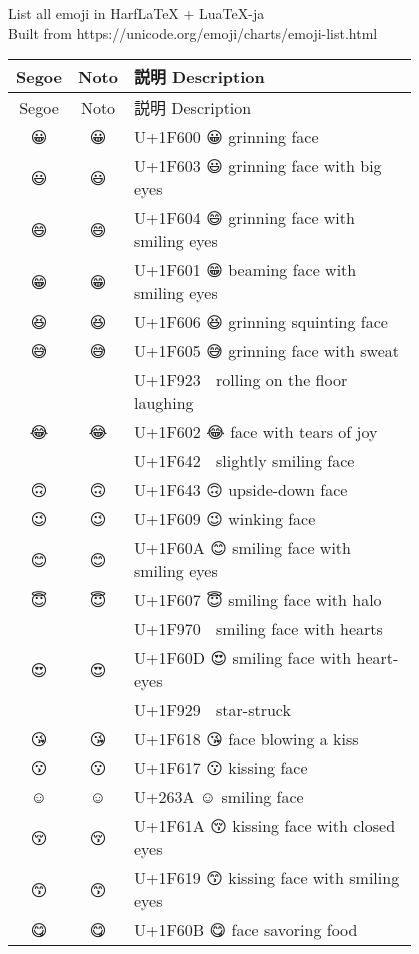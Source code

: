\documentclass[a4paper,12pt]{ltjarticle}
\newcommand{\fontA}[1]{{\fontspec[RawFeature={mode=harf,dist,ccmp}]{Segoe UI Emoji} #1}}
\newcommand{\fontB}[1]{{\fontspec[RawFeature={mode=harf,dist,ccmp}]{Noto Color Emoji} #1}}
\begin{document}
\noindent
List all emoji in HarfLaTeX + LuaTeX-ja\\
Built from https://unicode.org/emoji/charts/emoji-list.html

\noindent
\begin{longtable}[c]{ccp{0.8\linewidth}}
Segoe&Noto&説明 Description\\\hline
\endfirsthead  
Segoe&Noto&説明 Description\\\hline
\endhead  
\fontA{😀}&\fontB{😀}&U+1F600 😀 grinning face\\
\fontA{😃}&\fontB{😃}&U+1F603 😃 grinning face with big eyes\\
\fontA{😄}&\fontB{😄}&U+1F604 😄 grinning face with smiling eyes\\
\fontA{😁}&\fontB{😁}&U+1F601 😁 beaming face with smiling eyes\\
\fontA{😆}&\fontB{😆}&U+1F606 😆 grinning squinting face\\
\fontA{😅}&\fontB{😅}&U+1F605 😅 grinning face with sweat\\
\fontA{🤣}&\fontB{🤣}&U+1F923 🤣 rolling on the floor laughing\\
\fontA{😂}&\fontB{😂}&U+1F602 😂 face with tears of joy\\
\fontA{🙂}&\fontB{🙂}&U+1F642 🙂 slightly smiling face\\
\fontA{🙃}&\fontB{🙃}&U+1F643 🙃 upside-down face\\
\fontA{😉}&\fontB{😉}&U+1F609 😉 winking face\\
\fontA{😊}&\fontB{😊}&U+1F60A 😊 smiling face with smiling eyes\\
\fontA{😇}&\fontB{😇}&U+1F607 😇 smiling face with halo\\
\fontA{🥰}&\fontB{🥰}&U+1F970 🥰 smiling face with hearts\\
\fontA{😍}&\fontB{😍}&U+1F60D 😍 smiling face with heart-eyes\\
\fontA{🤩}&\fontB{🤩}&U+1F929 🤩 star-struck\\
\fontA{😘}&\fontB{😘}&U+1F618 😘 face blowing a kiss\\
\fontA{😗}&\fontB{😗}&U+1F617 😗 kissing face\\
\fontA{☺}&\fontB{☺}&U+263A ☺ smiling face\\
\fontA{😚}&\fontB{😚}&U+1F61A 😚 kissing face with closed eyes\\
\fontA{😙}&\fontB{😙}&U+1F619 😙 kissing face with smiling eyes\\
\fontA{😋}&\fontB{😋}&U+1F60B 😋 face savoring food\\

\end{longtable}
\end{document}
